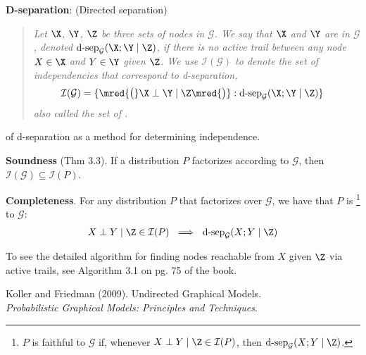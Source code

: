 \documentclass[11pt]{article}
\newcommand\myspace[1][]{\vspace{#1\bigskipamount}}
\newcommand\p{\Needspace{10\baselineskip} \noindent}
\begin{document}
\newcommand{\dsep}{\text{d-sep}_{\mathcal G}}
\p \textbf{D-separation}: (Directed separation)
\vspace{-0.5em}
\begin{quote}
	{\itshape Let $\X$, $\Y$, $\Z$ be three sets of nodes in $\mathcal G$. We say that $\X$ and $\Y$ are  in $\mathcal G$, denoted $\dsep(\X; \Y \mid \Z)$, if there is no active trail between any node $X \in \X$ and $Y \in \Y$ given $\Z$. We use $\mathcal{I}(\mathcal G)$ to denote the set of independencies that correspond to d-separation,
		\begin{align}
			\mathcal{I}(\mathcal G) &= \{ \mred{\big(}  \X \perp \Y \mid \Z \mred{\big)}  : \dsep(\X ; \Y \mid \Z) \}
		\end{align}
		also called the set of .
	}
\end{quote}

\myspace
\p {} of d-separation as a method for determining independence. 
\begin{compactitem}
	\item \textbf{Soundness} (Thm 3.3). If a distribution $P$ factorizes according to $\mathcal G$, then $\mathcal I(\mathcal G) \subseteq \mathcal I(P)$. 
	
	\item \textbf{Completeness}. For any distribution $P$ that factorizes over $\mathcal G$, we have that $P$ is \footnote{$P$ is faithful to $\mathcal G$ if, whenever $X \perp Y \mid \Z \in \mathcal{I}(P)$, then $\dsep(X; Y \mid \Z)$.} to $\mathcal G$: 
	\begin{align}
		X \perp Y \mid \Z \in \mathcal{I}(P) ~ \implies ~ \dsep(X; Y \mid \Z)
	\end{align}
\end{compactitem}
To see the detailed algorithm for finding nodes reachable from $X$ given $\Z$ via active trails, see Algorithm 3.1 on pg. 75 of the book.






\vspace{-1.7em}
{\scriptsize Koller and Friedman (2009). Undirected Graphical Models.\\ \textit{Probabilistic Graphical Models: Principles and Techniques}.\\ }
\end{document}
